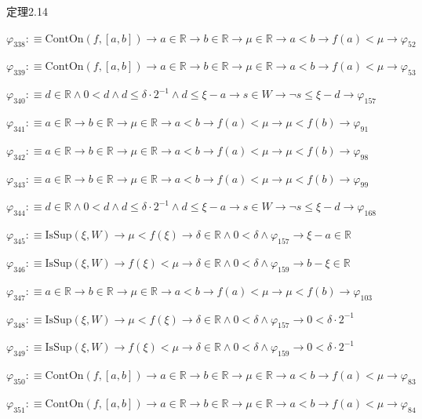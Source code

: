 \begin{fullproof}{定理2.14}
\begin{abbrevlist}
\item $\varphi_{338} :\equiv \mathrm{ContOn}(f,[a,b]) \to a \in \mathbb{R} \to b \in \mathbb{R} \to \mu \in \mathbb{R} \to a < b \to f(a) < \mu \to \varphi_{52}$
\item $\varphi_{339} :\equiv \mathrm{ContOn}(f,[a,b]) \to a \in \mathbb{R} \to b \in \mathbb{R} \to \mu \in \mathbb{R} \to a < b \to f(a) < \mu \to \varphi_{53}$
\item $\varphi_{340} :\equiv d \in \mathbb{R} \land 0 < d \land d \leq \delta \cdot 2^{-1} \land d \leq \xi - a \to s \in W \to \neg s \leq \xi - d \to \varphi_{157}$
\item $\varphi_{341} :\equiv a \in \mathbb{R} \to b \in \mathbb{R} \to \mu \in \mathbb{R} \to a < b \to f(a) < \mu \to \mu < f(b) \to \varphi_{91}$
\item $\varphi_{342} :\equiv a \in \mathbb{R} \to b \in \mathbb{R} \to \mu \in \mathbb{R} \to a < b \to f(a) < \mu \to \mu < f(b) \to \varphi_{98}$
\item $\varphi_{343} :\equiv a \in \mathbb{R} \to b \in \mathbb{R} \to \mu \in \mathbb{R} \to a < b \to f(a) < \mu \to \mu < f(b) \to \varphi_{99}$
\item $\varphi_{344} :\equiv d \in \mathbb{R} \land 0 < d \land d \leq \delta \cdot 2^{-1} \land d \leq \xi - a \to s \in W \to \neg s \leq \xi - d \to \varphi_{168}$
\item $\varphi_{345} :\equiv \mathrm{IsSup}(\xi,W) \to \mu < f(\xi) \to \delta \in \mathbb{R} \land 0 < \delta \land \varphi_{157} \to \xi - a \in \mathbb{R}$
\item $\varphi_{346} :\equiv \mathrm{IsSup}(\xi,W) \to f(\xi) < \mu \to \delta \in \mathbb{R} \land 0 < \delta \land \varphi_{159} \to b - \xi \in \mathbb{R}$
\item $\varphi_{347} :\equiv a \in \mathbb{R} \to b \in \mathbb{R} \to \mu \in \mathbb{R} \to a < b \to f(a) < \mu \to \mu < f(b) \to \varphi_{103}$
\item $\varphi_{348} :\equiv \mathrm{IsSup}(\xi,W) \to \mu < f(\xi) \to \delta \in \mathbb{R} \land 0 < \delta \land \varphi_{157} \to 0 < \delta \cdot 2^{-1}$
\item $\varphi_{349} :\equiv \mathrm{IsSup}(\xi,W) \to f(\xi) < \mu \to \delta \in \mathbb{R} \land 0 < \delta \land \varphi_{159} \to 0 < \delta \cdot 2^{-1}$
\item $\varphi_{350} :\equiv \mathrm{ContOn}(f,[a,b]) \to a \in \mathbb{R} \to b \in \mathbb{R} \to \mu \in \mathbb{R} \to a < b \to f(a) < \mu \to \varphi_{83}$
\item $\varphi_{351} :\equiv \mathrm{ContOn}(f,[a,b]) \to a \in \mathbb{R} \to b \in \mathbb{R} \to \mu \in \mathbb{R} \to a < b \to f(a) < \mu \to \varphi_{84}$

\end{abbrevlist}
\end{fullproof}
